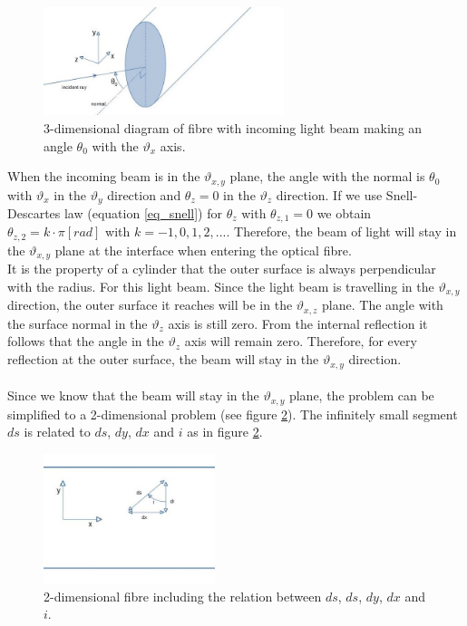 \documentclass{article}
\begin{document}
\begin{figure}[h!]
	\centering
	\includegraphics[width=7cm]{afbeeldingen/fibre_3d.jpg}
	\caption{3-dimensional diagram of fibre with incoming light beam making an angle $\theta _0$ with the $\vartheta _x$ axis.}
	\label{fig_fibre_3d}
\end{figure}
When the incoming beam is in the $\vartheta _{x,y}$ plane, the angle with the normal is $\theta _0$ with $\vartheta _x$ in the $\vartheta _y$ direction and $\theta _z = 0$ in the $\vartheta _z$ direction. If we use Snell-Descartes law (equation \ref{eq_snell}) for $\theta _z$ with $\theta _{z,1} = 0$ we obtain $\theta _{z,2} = k \cdot \pi [rad]$ with $k = -1,0,1,2,...$. Therefore, the beam of light will stay in the $\vartheta _{x,y}$ plane at the interface when entering the optical fibre. \\
It is the property of a cylinder that the outer surface is always perpendicular with the radius. For this light beam. Since the light beam is travelling in the $\vartheta _{x,y}$ direction, the outer surface it reaches will be in the $\vartheta _{x,z}$ plane. The angle with the surface normal in the $\vartheta _z$ axis is still zero. From the internal reflection it follows that the angle in  the $\vartheta _z$ axis will remain zero. Therefore, for every reflection at the outer surface, the beam will stay in the $\vartheta _{x,y}$ direction.\\
\\
Since we know that the beam will stay in the $\vartheta _{x,y}$ plane, the problem can  be simplified to a 2-dimensional problem (see figure \ref{fig_fibre_2d}). The infinitely small segment $ds$ is related to $ds$, $dy$, $dx$ and $i$ as in figure \ref{fig_fibre_2d}.


\begin{figure}[h!]
	\centering
	\includegraphics[width = 5cm]{afbeeldingen/fibre_2d.jpg}
	\caption{2-dimensional fibre including the relation between $ds$, $ds$, $dy$, $dx$ and $i$.}
	\label{fig_fibre_2d}
\end{figure}
\end{document}
